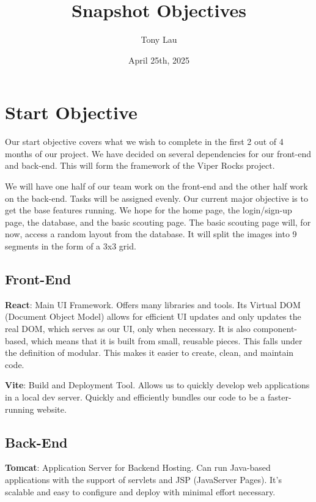 \documentclass{article}
\begin{document}
\title{Snapshot Objectives}
\author{Tony Lau}
\date{April 25th, 2025}

\maketitle

\section{Start Objective}
\fancyhf{}
\fancyfoot[C]{\thepage}

Our start objective covers what we wish to complete in the first 2 out of 4 months of our project. We have decided on several dependencies for our front-end and back-end. This will form the framework of the
Viper Rocks project.

We will have one half of our team work on the front-end and the other half work on the back-end. Tasks will be
assigned evenly. Our current major objective is to get the base features running. We hope for the home page, the login/sign-up page, the database, and the basic scouting page. The basic scouting page will, for now, access a random layout from the database. It will split the images into 9 segments in the form of a 3x3 grid.

\subsection{Front-End}
\textbf{React}: Main UI Framework. Offers many libraries and tools. Its Virtual DOM (Document Object Model) allows for efficient UI updates and only updates the real DOM, which serves as our UI, only when necessary. It is also component-based, which means that it is built from small, reusable pieces. This falls under the definition of modular. This makes it easier to create, clean, and maintain code.

\textbf{Vite}: Build and Deployment Tool. Allows us to quickly develop web applications in a local dev server. Quickly and efficiently bundles our code to be a faster-running website.

\subsection{Back-End}
 
\textbf{Tomcat}: Application Server for Backend Hosting. Can run Java-based applications with the support of servlets and JSP (JavaServer Pages). It's scalable and easy to configure and deploy with minimal effort necessary.
\end{document}
